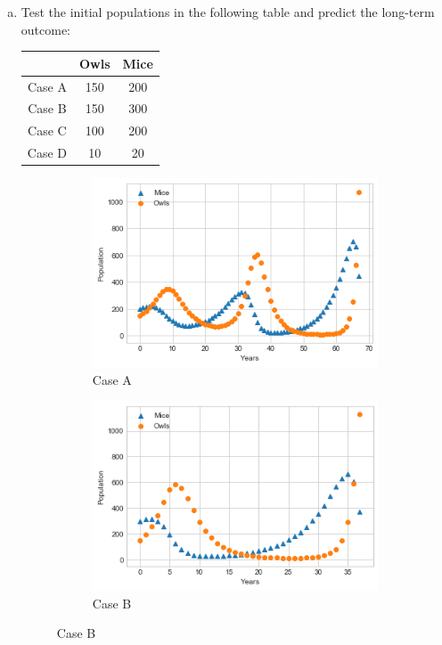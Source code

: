 \documentclass[10pt]{report}
\begin{document}
\begin{enumerate}
\begin{enumerate}[a.]
		\item 
		Test the initial populations in the following table and predict the long-term outcome:
		\begin{table}[H]
			\centering
			\begin{tabular}{*{3}{c}} 
				\toprule
				 & Owls & Mice\\ \midrule
				Case A & 150 & 200 \\
				Case B & 150 & 300 \\
				Case C & 100 & 200 \\
				Case D & 10 & 20 \\
				\bottomrule
			\end{tabular}
		\end{table}
		\begin{figure}[H]
			\centering
			\begin{subfigure}[b]{.5\linewidth}
				\caption{Case A}
				\includegraphics[width=\linewidth]{s1_4/caseA.png}
			\end{subfigure}%
			\begin{subfigure}[b]{.5\linewidth}
				\caption{Case B}
				\includegraphics[width=\linewidth]{s1_4/caseB.png}

\end{subfigure}
\end{figure}
\end{enumerate}
\end{enumerate}
\end{document}
